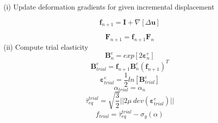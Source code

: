 \documentclass[sn-mathphys,Numbered,draft]{sn-jnl}%
\begin{document}
\begin{algorithm}[H]
\SetAlgoLined
(i) Update deformation gradients for given incremental displacement

\begin{equation}
  \mathbf{f}_{n+1}=\mathbf{I}+\nabla\left[\Delta\textbf{u}\right]\nonumber
\end{equation}

\begin{equation}
\mathbf{F}_{n+1}=\mathbf{f}_{n+1}\mathbf{F}_n\nonumber
\end{equation}
(ii) Compute trial elasticity
\begin{equation}
\mathbf{B}^{e}_{n}=exp\left[{2\boldsymbol{\varepsilon}^{e}_{n}}\right]\nonumber
\end{equation}
\begin{equation}
\mathbf{B}^{e}_{trial}=\mathbf{f}_{n+1}\mathbf{B}^{e}_{n}(\mathbf{f}_{n+1})^{T}\nonumber
\end{equation}
\begin{equation}
\boldsymbol{\varepsilon}^{e}_{trial}=\frac{1}{2}ln[\textbf{B}^{e}_{trial}]\nonumber
\end{equation}
\begin{equation}
\alpha_{trial}=\alpha_{n}\nonumber\nonumber
\end{equation}
\begin{equation}
\bar{\tau}_{eq}^{trial}=\sqrt{\frac{3}{2}}\lvert\lvert2\mu\ dev(\boldsymbol{\varepsilon}^{e}_{trial})\rvert\rvert\nonumber\nonumber
\end{equation}
\begin{equation}
f_{trial}=  \bar{\tau}_{eq}^{trial}-\sigma_{y}(\alpha) \nonumber 
\end{equation}


\end{algorithm}
\end{document}
